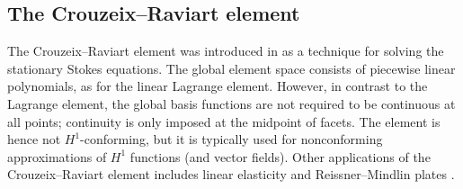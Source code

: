 \subsection{The Crouzeix--Raviart element}

The Crouzeix--Raviart element was introduced in
\citet{CrouzeixRaviart1973} as a technique for solving the stationary
Stokes equations. The global element space consists of piecewise linear
polynomials, as for the linear Lagrange element. However, in contrast to
the Lagrange element, the global basis functions are not required to be
continuous at all points; continuity is only imposed at the midpoint of
facets. The element is hence not $H^1$-conforming, but it is typically
used for nonconforming approximations of $H^1$ functions (and vector
fields). Other applications of the Crouzeix--Raviart element includes
linear elasticity \citep{HansboLarson2003} and Reissner--Mindlin plates
\citep{ArnoldFalk1989}.


